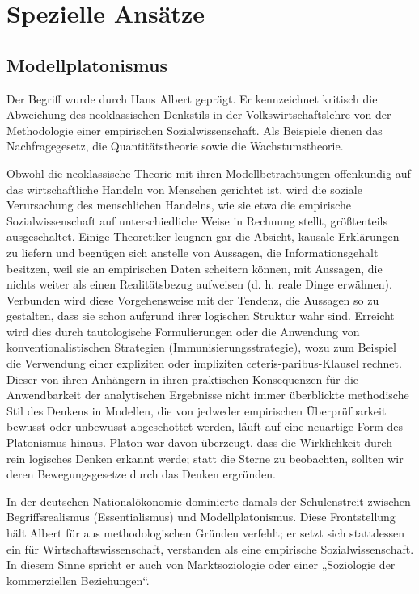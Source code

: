 \documentclass[a4paper, 12pt, pagesize]{scrartcl}
\begin{document}
\section{Spezielle Ansätze}
\subsection{Modellplatonismus}
Der Begriff wurde durch Hans Albert geprägt. Er kennzeichnet kritisch die Abweichung des neoklassischen Denkstils in der Volkswirtschaftslehre von der Methodologie einer empirischen Sozialwissenschaft. Als Beispiele dienen das Nachfragegesetz, die Quantitätstheorie sowie die Wachstumstheorie.

Obwohl die neoklassische Theorie mit ihren Modellbetrachtungen offenkundig auf das wirtschaftliche Handeln von Menschen gerichtet ist, wird die soziale Verursachung des menschlichen Handelns, wie sie etwa die empirische Sozialwissenschaft auf unterschiedliche Weise in Rechnung stellt, größtenteils ausgeschaltet. Einige Theoretiker leugnen gar die Absicht, kausale Erklärungen zu liefern und begnügen sich anstelle von Aussagen, die Informationsgehalt besitzen, weil sie an empirischen Daten scheitern können, mit Aussagen, die nichts weiter als einen Realitätsbezug aufweisen (d. h. reale Dinge erwähnen). Verbunden wird diese Vorgehensweise mit der Tendenz, die Aussagen so zu gestalten, dass sie schon aufgrund ihrer logischen Struktur wahr sind. Erreicht wird dies durch tautologische Formulierungen oder die Anwendung von konventionalistischen Strategien (Immunisierungsstrategie), wozu zum Beispiel die Verwendung einer expliziten oder impliziten ceteris-paribus-Klausel rechnet. Dieser von ihren Anhängern in ihren praktischen Konsequenzen für die Anwendbarkeit der analytischen Ergebnisse nicht immer überblickte methodische Stil des Denkens in Modellen, die von jedweder empirischen Überprüfbarkeit bewusst oder unbewusst abgeschottet werden, läuft auf eine neuartige Form des Platonismus hinaus. Platon war davon überzeugt, dass die Wirklichkeit durch rein logisches Denken erkannt werde; statt die Sterne zu beobachten, sollten wir deren Bewegungsgesetze durch das Denken ergründen.

In der deutschen Nationalökonomie dominierte damals der Schulenstreit zwischen Begriffsrealismus (Essentialismus) und Modellplatonismus. Diese Frontstellung hält Albert für aus methodologischen Gründen verfehlt; er setzt sich stattdessen ein für Wirtschaftswissenschaft, verstanden als eine empirische Sozialwissenschaft. In diesem Sinne spricht er auch von Marktsoziologie oder einer „Soziologie der kommerziellen Beziehungen“.
\end{document}
